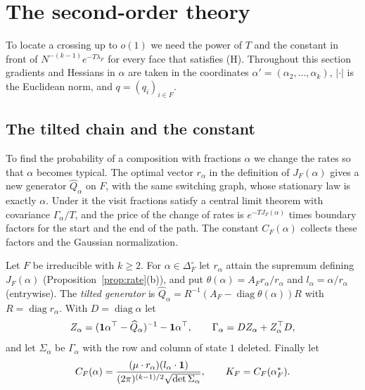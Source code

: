 \section{The second-order theory}\label{sec:secondorder}

To locate a crossing up to $o(1)$ we need the power of $T$ and the constant in front
of $N^{-(k-1)}e^{-T\lambda_F}$ for every face that satisfies (H). Throughout this section
gradients and Hessians in $\alpha$ are taken in the coordinates
$\alpha'=(\alpha_2,\dots,\alpha_k)$, $|\cdot|$ is the Euclidean norm, and
$q=(q_i)_{i\in F}$.

\subsection{The tilted chain and the constant}\label{sec:tilt}

To find the probability of a composition with fractions $\alpha$ we change the
rates so that $\alpha$ becomes typical. The optimal vector $r_\alpha$ in the
definition of $J_F(\alpha)$ gives a new generator $\widehat Q_\alpha$ on $F$, with
the same switching graph, whose stationary law is exactly $\alpha$. Under it the
visit fractions satisfy a central limit theorem with covariance
$\Gamma_\alpha/T$, and the price of the change of rates is $e^{-TJ_F(\alpha)}$
times boundary factors for the start and the end of the path. The constant
$C_F(\alpha)$ collects these factors and the Gaussian normalization.

\begin{definition}\label{def:tilt}
Let $F$ be irreducible with $k\ge2$. For
$\alpha\in\Delta_F^\circ$ let $r_\alpha$ attain the supremum defining
$J_F(\alpha)$ (Proposition~\ref{prop:rate}(b)), and put
$\theta(\alpha)=A_Fr_\alpha/r_\alpha$ and $l_\alpha=\alpha/r_\alpha$
(entrywise). The \emph{tilted generator} is
$\widehat Q_\alpha=R^{-1}(A_F-\operatorname{diag}\theta(\alpha))R$ with
$R=\operatorname{diag}r_\alpha$. With $D=\operatorname{diag}\alpha$ let
\[
Z_\alpha=(\mathbf{1}\alpha^\top-\widehat Q_\alpha)^{-1}-\mathbf{1}\alpha^\top,
\qquad\Gamma_\alpha=DZ_\alpha+Z_\alpha^\top D,
\]
and let $\Sigma_\alpha$ be $\Gamma_\alpha$ with the row and column of state
$1$ deleted. Finally let
\[
C_F(\alpha)=\frac{(\mu\cdot r_\alpha)(l_\alpha\cdot\mathbf{1})}
{(2\pi)^{(k-1)/2}\sqrt{\det\Sigma_\alpha}},\qquad K_F=C_F(\alpha^*_F).
\]
\end{definition}


